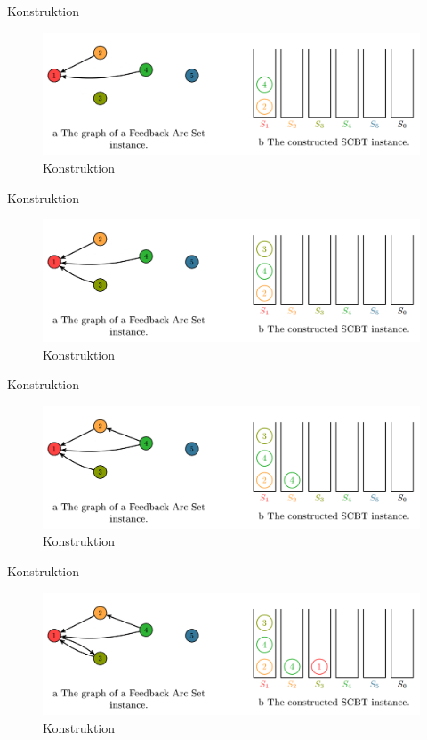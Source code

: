 \documentclass{beamer}
\begin{document}
\begin{frame}{Konstruktion}
\begin{figure}[ht]
		\includegraphics[width=\textwidth]{construct08}
		\caption{Konstruktion}
    \end{figure}
\end{frame}

\begin{frame}{Konstruktion}
\begin{figure}[ht]
		\includegraphics[width=\textwidth]{construct07}
		\caption{Konstruktion}
    \end{figure}
\end{frame}

\begin{frame}{Konstruktion}
\begin{figure}[ht]
		\includegraphics[width=\textwidth]{construct06}
		\caption{Konstruktion}
    \end{figure}
\end{frame}

\begin{frame}{Konstruktion}
\begin{figure}[ht]
		\includegraphics[width=\textwidth]{construct05}
		\caption{Konstruktion}
    \end{figure}
\end{frame}
\end{document}
